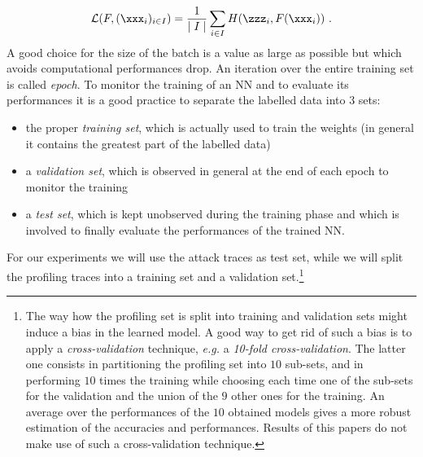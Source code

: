 \begin{equation}
\mathcal{L}(F,(\xxx_i)_{i\in I}) = \frac{1}{\mid I\mid}\sum_{i \in I}H(\zzz_i, F(\xxx_i)) \mbox{ .}
\end{equation}
 A good choice for the size of the batch is a value as large as possible but which avoids computational performances drop. An iteration over the entire training set is called {\em epoch}. To monitor the training of an NN and to evaluate its performances it is a good practice to separate the labelled data into $3$ sets: 
\begin{itemize}
\item the proper \emph{training set}, which is actually used to train the weights (in general it contains the greatest part of the labelled data)
\item a \emph{validation set}, which is observed in general at the end of each epoch to monitor the training
\item a \emph{test set}, which is kept unobserved during the training phase and which is involved to finally evaluate the performances of the trained NN.
\end{itemize}

For our experiments we will use the attack traces as test set, while we will split the profiling traces into a training set and a validation set.\footnote{The way how the profiling set is split into training and validation sets might induce a bias in the learned model. A good way to get rid of such a bias is to apply a \emph{cross-validation} technique, \emph{e.g.} a \emph{10-fold cross-validation}. The latter one consists in partitioning the profiling set into $10$ sub-sets, and in performing $10$ times the training while choosing each time one of the sub-sets for the validation and the union of the $9$ other ones for the training. An average over the performances of the $10$ obtained models gives a more robust estimation of the accuracies and performances. Results of this papers do not make use of such a cross-validation technique.}

